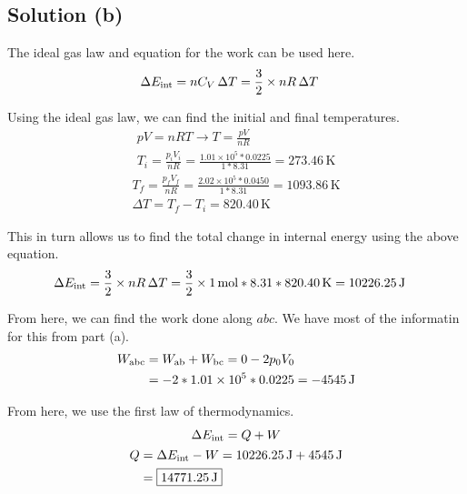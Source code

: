 \documentclass[12pt]{article}
\newcommand{\E}[1]{\times 10^{#1}}
\begin{document}
        \subsection{Solution (b)}
            The ideal gas law and equation for the work can be used here.
            \begin{align}
                \Delta E_{\rm int}  &=  nC_V\,\Delta T
                    =   \frac{3}{2} \times nR\,\Delta T
            \end{align}

            Using the ideal gas law, we can find the initial and final temperatures.
            \begin{gather}
                pV  =   nRT \to
                T   =   \frac{pV}{nR}\\
                T_i =   \frac{p_i V_i}{nR}
                    =   \frac{1.01 \E{5} * 0.0225}{1 * 8.31}
                    =   273.46\,\unit{\kelvin}
            \end{gather}
            \begin{gather}
                T_f =   \frac{p_f V_f}{nR}
                    =   \frac{2.02 \E{5} * 0.0450}{1 * 8.31}
                    =   1093.86\,\unit{\kelvin}\\
                \Delta T    =   T_f - T_i
                    =   820.40\,\unit{\kelvin}
            \end{gather}

            This in turn allows us to find the total change in internal energy using the above equation.
            \begin{align}
                \Delta E_{\rm int}  &=  \frac{3}{2} \times nR\,\Delta T
                    =   \frac{3}{2} \times 1\,\unit{\mole} * 8.31 * 820.40\,\unit{\kelvin}
                    =  10226.25\,\unit{\joule}
            \end{align}

            From here, we can find the work done along $abc$. 
            We have most of the informatin for this from part (a).
            \begin{align}
                W_{\rm abc} &=  W_{\rm ab} + W_{\rm bc}
                    =   0 - 2 p_0 V_0\\
                    &=  -2 * 1.01\E{5} * 0.0225
                    =   -4545\,\unit{\joule}
            \end{align}
            
            From here, we use the first law of thermodynamics.
            \begin{gather}
                \Delta E_{\rm int} = Q + W\\
                \begin{align}
                    Q   &=  \Delta E_{\rm int} - W
                        =   10226.25\,\unit{\joule} + 4545\,\unit{\joule}\\
                        &=  \boxed{14771.25\,\unit{\joule}}
                \end{align}
            \end{gather}
\end{document}

